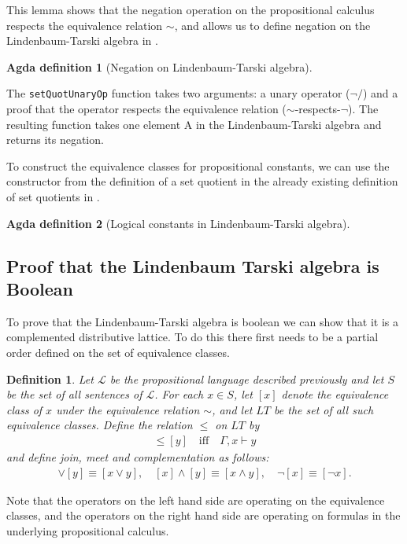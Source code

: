 \documentclass[titlepage]{article}
\newtheorem{definition}{Definition}[section]
\newtheorem{agdadef}{Agda definition}
\begin{document}
This lemma shows that the negation operation on the propositional calculus respects the equivalence relation $\sim$, and allows us to define negation on the Lindenbaum-Tarski algebra in \CubicalAgda.

\begin{agdadef}[Negation on Lindenbaum-Tarski algebra]$ $
\end{agdadef}


The \texttt{setQuotUnaryOp} function takes two arguments: a unary operator ($\neg/$) and a proof that the operator respects the equivalence relation ($\sim$-respects-$\neg$). The resulting function takes one element A in the Lindenbaum-Tarski algebra and returns its negation.

To construct the equivalence classes for propositional constants, we can use the constructor from the definition of a set quotient in the already existing definition of set quotients in \CubicalAgda.

\begin{agdadef}[Logical constants in Lindenbaum-Tarski algebra]$ $
\end{agdadef}


\subsection{Proof that the Lindenbaum Tarski algebra is Boolean}

To prove that the Lindenbaum-Tarski algebra is boolean we can show that it is a complemented distributive lattice. To do this there first needs to be a partial order defined on the set of equivalence classes.
\begin{definition}\label{order-relation}
    Let $\mathcal{L}$ be the propositional language described previously and let $S$ be the set of all sentences of $\mathcal{L}$. For each $x\in S$, let $[x]$ denote the equivalence class of $x$ under the equivalence relation $\sim$, and let $LT$ be the set of all such equivalence classes. Define the relation $\leq$ on $LT$ by
    \begin{align*}
        [x] \leq [y] \quad \text{iff} \quad \Gamma, x \vdash y
    \end{align*}
    and define join, meet and complementation as follows:
    \begin{align*}
        [x] \vee [y] \equiv [x\vee y], \quad [x] \wedge [y] \equiv [x \wedge y], \quad \neg[x] \equiv [\neg x].
    \end{align*}
\end{definition}
Note that the operators on the left hand side are operating on the equivalence classes, and the operators on the right hand side are operating on formulas in the underlying propositional calculus.
\end{document}
